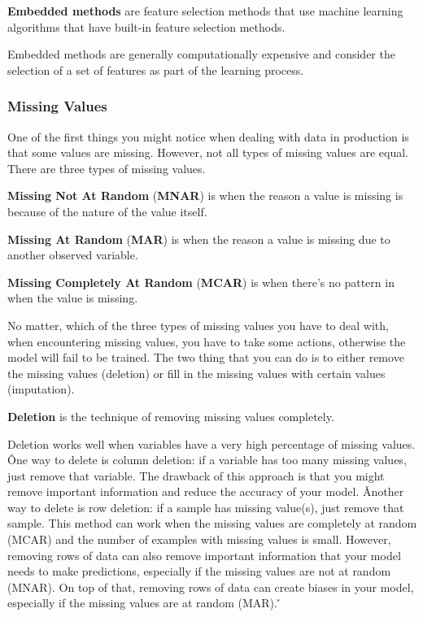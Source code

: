 \textbf{Embedded methods} are feature selection methods that use machine learning algorithms that have built-in
feature selection methods.
\ed

Embedded methods are generally computationally expensive and consider the selection of a set of features as part of
the learning process.

\subsubsection{Missing Values}

One of the first things you might notice when dealing with data in production is that some values are missing.
However, not all types of missing values are equal. There are three types of missing values.

\textbf{Missing Not At Random} (\textbf{MNAR}) is when the reason a value is missing is because of the nature of the
value itself.
\ed

\textbf{Missing At Random} (\textbf{MAR}) is when the reason a value is missing due to another observed variable.
\ed

\textbf{Missing Completely At Random} (\textbf{MCAR}) is when there's no pattern in when the value is missing.
\ed

No matter, which of the three types of missing values you have to deal with, when encountering missing values, you
have to take some actions, otherwise the model will fail to be trained. The two thing that you can do is to either
remove the missing values (deletion) or fill in the missing values with certain values (imputation).

\bd[Deletion]
\textbf{Deletion} is the technique of removing missing values completely.
\ed

Deletion works well when variables have a very high percentage of missing values. \v

One way to delete is column deletion: if a variable has too many missing values, just remove that variable. The
drawback of this approach is that you might remove important information and reduce the accuracy of your model. \v

Another way to delete is row deletion: if a sample has missing value(s), just remove that sample. This method can
work when the missing values are completely at random (MCAR) and the number of examples with missing values is small.
However, removing rows of data can also remove important information that your model needs to make predictions,
especially if the missing values are not at random (MNAR). On top of that, removing rows of data can create biases in
your model, especially if the missing values are at random (MAR). \v

